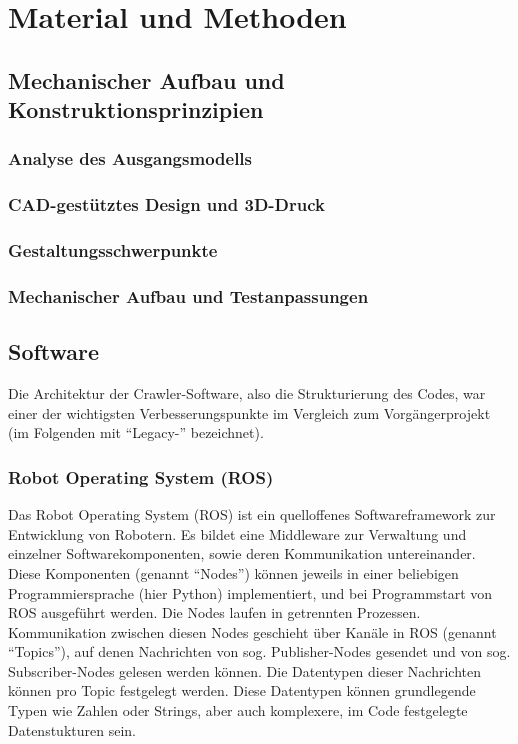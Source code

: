\section{Material und Methoden}

\subsection{Mechanischer Aufbau und Konstruktionsprinzipien}

\subsubsection{Analyse des Ausgangsmodells}
\subsubsection{CAD-gestütztes Design und 3D-Druck}
\subsubsection{Gestaltungsschwerpunkte}
\subsubsection{Mechanischer Aufbau und Testanpassungen}

\subsection{Software}

Die Architektur der Crawler-Software, also die Strukturierung des Codes, war einer der wichtigsten Verbesserungspunkte im Vergleich zum Vorgängerprojekt (im Folgenden mit ``Legacy-'' bezeichnet). 

\subsubsection{Robot Operating System (ROS)}

Das Robot Operating System (ROS)\cite{ros} ist ein quelloffenes Softwareframework zur Entwicklung von Robotern. Es bildet eine Middleware zur Verwaltung und einzelner Softwarekomponenten, sowie deren Kommunikation untereinander. Diese Komponenten (genannt ``Nodes'') können jeweils in einer beliebigen Programmiersprache (hier Python) implementiert, und bei Programmstart von ROS ausgeführt werden. Die Nodes laufen in getrennten Prozessen. Kommunikation zwischen diesen Nodes geschieht über Kanäle in ROS (genannt ``Topics''), auf denen Nachrichten von sog. Publisher-Nodes gesendet und von sog. Subscriber-Nodes gelesen werden können. Die Datentypen dieser Nachrichten können pro Topic festgelegt werden. Diese Datentypen können grundlegende Typen wie Zahlen oder Strings, aber auch komplexere, im Code festgelegte Datenstukturen sein.

